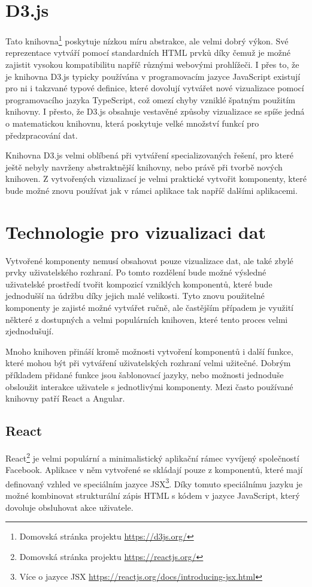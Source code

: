 \section{D3.js}
Tato knihovna\footnote{Domovská stránka projektu \url{https://d3js.org/}} poskytuje nízkou míru abstrakce, ale velmi dobrý výkon. Své reprezentace vytváří pomocí standardních HTML prvků díky čemuž je možné zajistit vysokou kompatibilitu napříč různými webovými prohlížeči. I přes to, že je knihovna D3.js typicky používána v programovacím jazyce JavaScript existují pro ni i takzvané typové definice, které dovolují vytvářet nové vizualizace pomocí programovacího jazyka TypeScript, což omezí chyby vzniklé špatným použitím knihovny. I přesto, že D3.js obsahuje vestavěné způsoby vizualizace se spíše jedná o matematickou knihovnu, která poskytuje velké množství funkcí pro předzpracování dat.

Knihovna D3.js velmi oblíbená při vytváření specializovaných řešení, pro které ještě nebyly navrženy abstraktnější knihovny, nebo právě při tvorbě nových knihoven. Z vytvořených vizualizací je velmi praktické vytvořit komponenty, které bude možné znovu používat jak v rámci aplikace tak napříč dalšími aplikacemi.

\section{Technologie pro vizualizaci dat}
Vytvořené komponenty nemusí obsahovat pouze vizualizace dat, ale také zbylé prvky uživatelského rozhraní. Po tomto rozdělení bude možné výsledné uživatelské prostředí tvořit kompozicí vzniklých komponentů, které bude jednodušší na údržbu díky jejich malé velikosti. Tyto znovu použitelné komponenty je zajisté možné vytvářet ručně, ale častějším případem je využití některé z dostupných a velmi populárních knihoven, které tento proces velmi zjednodušují.

Mnoho knihoven přináší kromě možnosti vytvoření komponentů i další funkce, které mohou být při vytváření uživatelských rozhraní velmi užitečné. Dobrým příkladem přidané funkce jsou šablonovací jazyky, nebo možnosti jednoduše obsloužit interakce uživatele s jednotlivými komponenty. Mezi často používané knihovny patří React a Angular.

\subsection*{React}
React\footnote{Domovská stránka projektu \url{https://reactjs.org/}} je velmi populární a minimalistický aplikační rámec vyvíjený společností Facebook. Aplikace v něm vytvořené se skládají pouze z komponentů, které mají definovaný vzhled ve speciálním jazyce JSX\footnote{Více o jazyce JSX \url{https://reactjs.org/docs/introducing-jsx.html}}. Díky tomuto speciálnímu jazyku je možné kombinovat strukturální zápis HTML s kódem v jazyce JavaScript, který dovoluje obsluhovat akce uživatele. 

